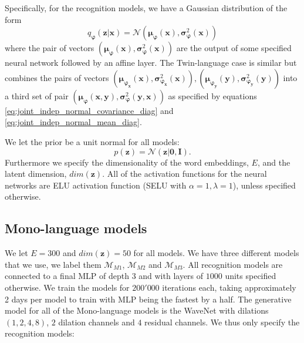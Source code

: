 Specifically, for the recognition models, we have a Gaussian distribution of the
form
\begin{equation*}
  q_{\bm{\varphi}}(\bm{z} | \bm{x}) = \mathcal{N}(\bm{\mu}_{\bm{\varphi}}(\bm{x}), \bm{\sigma}^2_{\bm{\varphi}}(\bm{x}))
\end{equation*}
where the pair of vectors $(\bm{\mu}_{\bm{\varphi}}(\bm{x}),
\bm{\sigma}^2_{\bm{\varphi}}(\bm{x}))$ are the output of some specified neural
network followed by an affine layer. The Twin-language case is similar but
combines the pairs of vectors $(\bm{\mu}_{\bm{\varphi}_{\bm{x}}}(\bm{x}),
\bm{\sigma}^2_{\bm{\varphi}_{\bm{x}}}(\bm{x})), (\bm{\mu}_{\bm{\varphi}_{\bm{y}}}(\bm{y}),
\bm{\sigma}^2_{\bm{\varphi}_{\bm{y}}}(\bm{y}))$ into a third set of pair
$(\bm{\mu}_{\bm{\varphi}}(\bm{x}, \bm{y}), \bm{\sigma}^2_{\bm{\varphi}}(\bm{y},
\bm{x}))$ as specified by equations
\eqref{eq:joint_indep_normal_covariance_diag} and
\eqref{eq:joint_indep_normal_mean_diag}.

We let the prior be a unit normal for all models:
\begin{equation}
  \label{eq:prior_distribution_generative}
  p(\bm{z}) = \mathcal{N}(\bm{z} | \bm{0}, \bm{I}).
\end{equation}
Furthermore we specify the dimensionality of the word embeddings, $E$, and the
latent dimension, $dim(\bm{z})$. All of the activation functions for the neural networks are ELU
activation function (SELU with $\alpha = 1, \lambda = 1$), unless specified otherwise.

\subsection{Mono-language models}
We let $E = 300$ and $dim(\bm{z}) = 50$ for all models. We have three different
models that we use, we label them $\mathcal{M}_{M1}$, $\mathcal{M}_{M2}$ and
$\mathcal{M}_{M3}$. All recognition models are connected to a final MLP of depth
$3$ and with layers of $1000$ units specified otherwise. We train the models for $200'000$ iterations each, taking
approximately 2 days per model to train with MLP being the fastest by a half.
The generative model for all of the Mono-language models is the WaveNet with
dilations $(1, 2, 4, 8)$, $2$ dilation channels and $4$ residual channels. We
thus only specify the recognition models:

